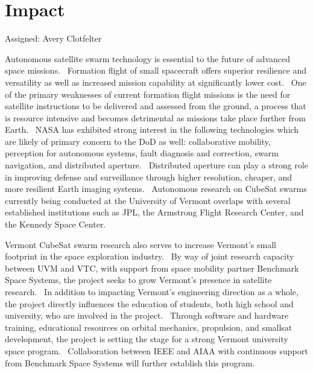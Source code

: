\section{Impact}
Assigned: Avery Clotfelter

Autonomous satellite swarm technology is essential to the future of
advanced space missions.  Formation flight of small spacecraft offers
superior resilience and versatility as well as increased mission
capability at significantly lower cost.  One of the primary weaknesses
of current formation flight missions is the need for satellite
instructions to be delivered and assessed from the ground, a process
that is resource intensive and becomes detrimental as missions take
place further from Earth.  NASA has exhibited strong interest in the
following technologies which are likely of primary concern to the DoD
as well: collaborative mobility, perception for autonomous systems,
fault diagnosis and correction, swarm navigation, and distributed
aperture.  Distributed aperture can play a strong role in improving
defense and surveillance through higher resolution, cheaper, and more
resilient Earth imaging systems.  Autonomous research on CubeSat
swarms currently being conducted at the University of Vermont overlaps
with several established institutions such as JPL, the Armstrong
Flight Research Center, and the Kennedy Space Center. 

Vermont CubeSat swarm research also serves to increase Vermont’s small
footprint in the space exploration industry.  By way of joint research
capacity between UVM and VTC, with support from space mobility partner
Benchmark Space Systems, the project seeks to grow Vermont’s presence
in satellite research.  In addition to impacting Vermont’s engineering
direction as a whole, the project directly influences the education of
students, both high school and university, who are involved in the
project.  Through software and hardware training, educational
resources on orbital mechanics, propulsion, and smallsat development,
the project is setting the stage for a strong Vermont university space
program.  Collaboration between IEEE and AIAA with continuous support
from Benchmark Space Systems will further establish this program.


